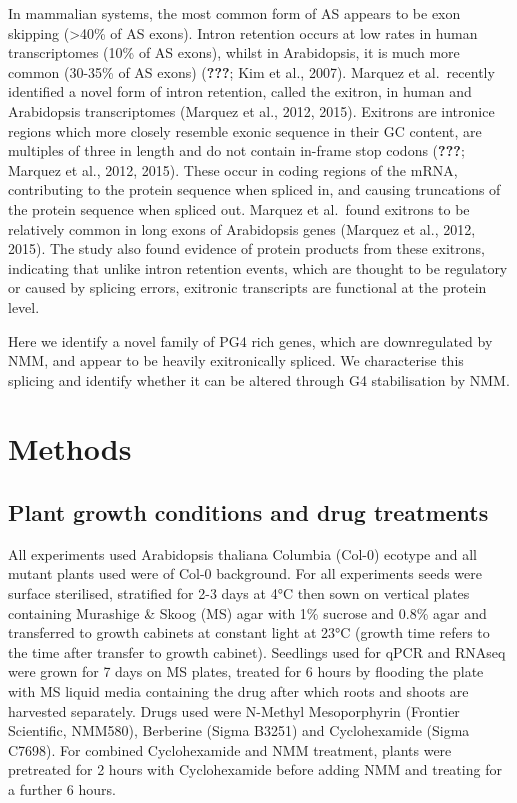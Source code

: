\documentclass[12pt,a4paper,]{report}
\begin{document}
\newpage

In mammalian systems, the most common form of AS appears to be exon
skipping (\textgreater{}40\% of AS exons). Intron retention occurs at
low rates in human transcriptomes (10\% of AS exons), whilst in
Arabidopsis, it is much more common (30-35\% of AS exons)
({\textbf{???}}; Kim et al., 2007). Marquez et al.~recently identified a
novel form of intron retention, called the exitron, in human and
Arabidopsis transcriptomes (Marquez et al., 2012, 2015). Exitrons are
intronice regions which more closely resemble exonic sequence in their
GC content, are multiples of three in length and do not contain in-frame
stop codons ({\textbf{???}}; Marquez et al., 2012, 2015). These occur in
coding regions of the mRNA, contributing to the protein sequence when
spliced in, and causing truncations of the protein sequence when spliced
out. Marquez et al.~found exitrons to be relatively common in long exons
of Arabidopsis genes (Marquez et al., 2012, 2015). The study also found
evidence of protein products from these exitrons, indicating that unlike
intron retention events, which are thought to be regulatory or caused by
splicing errors, exitronic transcripts are functional at the protein
level.

Here we identify a novel family of PG4 rich genes, which are
downregulated by NMM, and appear to be heavily exitronically spliced. We
characterise this splicing and identify whether it can be altered
through G4 stabilisation by NMM.

\newpage

\hypertarget{methods-1}{%
\section{Methods}\label{methods-1}}

\label{sec:extensin_methods}

\hypertarget{plant-growth-conditions-and-drug-treatments}{%
\subsection{Plant growth conditions and drug
treatments}\label{plant-growth-conditions-and-drug-treatments}}

All experiments used Arabidopsis thaliana Columbia (Col-0) ecotype and
all mutant plants used were of Col-0 background. For all experiments
seeds were surface sterilised, stratified for 2-3 days at 4°C then sown
on vertical plates containing Murashige \& Skoog (MS) agar with 1\%
sucrose and 0.8\% agar and transferred to growth cabinets at constant
light at 23°C (growth time refers to the time after transfer to growth
cabinet). Seedlings used for qPCR and RNAseq were grown for 7 days on MS
plates, treated for 6 hours by flooding the plate with MS liquid media
containing the drug after which roots and shoots are harvested
separately. Drugs used were N-Methyl Mesoporphyrin (Frontier Scientific,
NMM580), Berberine (Sigma B3251) and Cyclohexamide (Sigma C7698). For
combined Cyclohexamide and NMM treatment, plants were pretreated for 2
hours with Cyclohexamide before adding NMM and treating for a further 6
hours.
\end{document}
